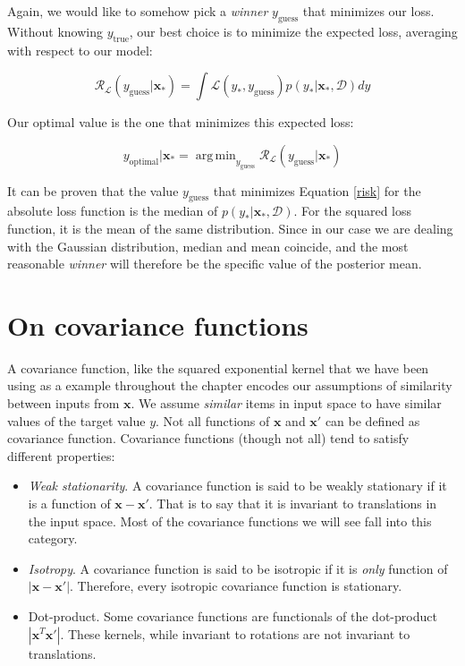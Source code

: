 \documentclass[10pt,a4paper,twoside]{book}
\DeclareMathOperator*{\argmin}{arg\,min}
\begin{document}
Again, we would like to somehow pick a \textit{winner} $y_{\mathrm{guess}}$ that minimizes our loss. Without knowing $y_{\mathrm{true}}$, our best choice is to minimize the expected loss, averaging with respect to our model:

\begin{equation}
\mathcal{R}_{\mathcal{L}}(y_{\mathrm{guess}}|\boldsymbol{x}_*) = \int \mathcal{L}(y_{*}, y_{\mathrm{guess}})p(y_*|\boldsymbol{x}_*, \mathcal{D})dy
\end{equation}

Our optimal value is the one that minimizes this expected loss:

\begin{equation}
\label{risk}
y_{\mathrm{optimal}}|\boldsymbol{x}_* = \argmin_{y_{\mathrm{guess}}}\mathcal{R}_{\mathcal{L}}(y_{\mathrm{guess}}|\boldsymbol{x}_*)
\end{equation}

It can be proven that the value $y_{\mathrm{guess}}$ that minimizes Equation \ref{risk} for the absolute loss function is the median of $p(y_*|\boldsymbol{x}_*,\mathcal{D})$. For the squared loss function, it is the mean of the same distribution. Since in our case we are dealing with the Gaussian distribution, median and mean coincide, and the most reasonable \textit{winner} will therefore be the specific value of the posterior mean. 

\section{On covariance functions}
\label{covariancefunc}

A covariance function, like the squared exponential kernel that we have been using as a example throughout the chapter encodes our assumptions of similarity between inputs from $\boldsymbol{x}$. We assume \textit{similar} items in input space to have similar values of the target value $y$. Not all functions of $\boldsymbol{x}$ and $\boldsymbol{x'}$ can be defined as covariance function. Covariance functions (though not all) tend to satisfy different properties:

\begin{itemize}
\item \textit{Weak stationarity}. A covariance function is said to be weakly stationary if it is a function of $\boldsymbol{x} - \boldsymbol{x'}$. That is to say that it is invariant to translations in the input space. Most of the covariance functions we will see fall into this category.
\item \textit{Isotropy}. A covariance function is said to be isotropic if it is \textit{only} function of  $|\boldsymbol{x} - \boldsymbol{x'}|$. Therefore, every isotropic covariance function is stationary.
\item Dot-product. Some covariance functions are functionals of the dot-product $|\boldsymbol{x}^T \boldsymbol{x'}|$. These kernels, while invariant to rotations are not invariant to translations.
\end{itemize}
\end{document}
